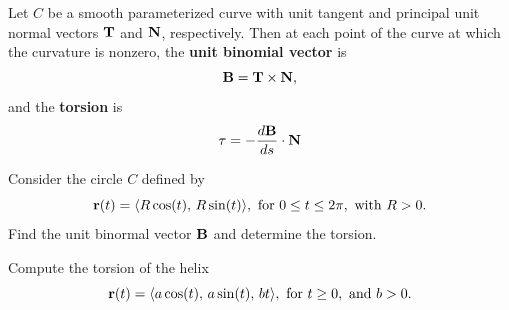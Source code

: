 \documentclass[mathNotesPreamble]{subfiles}
\begin{document}
  \begin{defn*}
    Let $C$ be a smooth parameterized curve with unit tangent and principal unit normal vectors ${\mathbf{T}}$ and ${\mathbf{N}}$, respectively. Then at each point of the curve at which the curvature is nonzero, the \textbf{unit binomial vector} is
      \[{\mathbf{B}}={\mathbf{T}}\times{\mathbf{N}},\]
    and the \textbf{torsion} is
      \[\tau=-\frac{d{\mathbf{B}}}{ds}\cdot{\mathbf{N}}\]
  \end{defn*}
  \pagebreak

  \begin{ex*}
    Consider the circle $C$ defined by
      \[{\mathbf{r}}(t)={\left\langle R\cos(t),\,R\sin(t) \right\rangle}, \textnormal{ for }0\leq t\leq 2\pi,\textnormal{ with }R>0.\]
    Find the unit binormal vector ${\mathbf{B}}$ and determine the torsion.
  \end{ex*}

  \begin{ex*}
    Compute the torsion of the helix
      \[{\mathbf{r}}(t)={\left\langle a\cos(t),\,a\sin(t),\,bt \right\rangle}, \textnormal{ for }t\geq 0,\textnormal{ and }b>0.\]
  \end{ex*}

  \pagebreak

  \noindent

  \pagebreak
  
\end{document}
